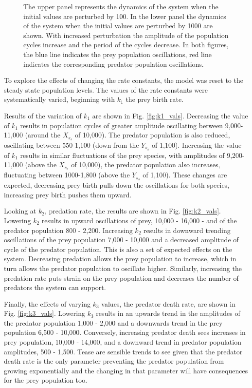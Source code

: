 \documentclass{article}
\begin{document}
\begin{figure}[H]
    \caption{The upper panel represents the dynamics of the system when the initial values are perturbed by 100. In the lower panel the dynamics of the system when the initial values are perturbed by 1000 are shown. With increased perturbation the amplitude of the population cycles increase and the period of the cycles decrease. In both figures, the blue line indicates the prey population oscillations, red line indicates the corresponding predator population oscillations.}
    \label{fig:testing_inital_vals}
\end{figure}

To explore the effects of changing the rate constants, the model was reset to the steady state population levels.  
The values of the rate constants were systematically varied, beginning with $k_1$ the prey birth rate. 

Results of the variation of $k_1$ are shown in Fig. \ref{fig:k1_vals}. Decreasing the value of $k_1$ results in population cycles of greater amplitude oscillating between 9,000-11,000 (around the $X_s_s$ of 10,000). The predator population is also reduced, oscillating between 550-1,100 (down from the $Y_s_s$ of 1,100). Increasing the value of $k_1$ results in similar fluctuations of the prey species, with amplitudes of 9,200-11,000 (above the $X_s_s$ of 10,000), the predator population also increases, fluctuating between 1000-1,800 (above the $Y_s_s$ of 1,100). These changes are expected, decreasing prey birth pulls down the oscillations for both species, increasing prey birth pushes them upward. 

Looking at $k_2$, predation rate, the results are shown in Fig. \ref{fig:k2_vals}. Lowering $k_2$ results in upward oscillations of prey, 10,000 - 16,000 - and of the predator population 800 - 2,200. Increasing $k_2$ results in downward trending oscillations of the prey population 7,000 - 10,000 and a decreased amplitude of cycle of the predator population. This is also a set of expected effects on the system. Decreasing predation allows the prey population to increase, which in turn allows the predator population to oscillate higher. Similarly, increasing the predation rate puts strain on the prey population and decreases the number of predators the system can support. 

Finally, the effects of varying $k_3$ values, the predator death rate, are shown in Fig. \ref{fig:k3_vals}. Lowering $k_3$ results in an upwards trend in the amplitudes of the predator population 1,000 - 2,000 and a downwards trend in the prey population 6,500 - 10,000. Conversely, increasing predator death sees increases in prey population, 10,000 - 14,000, and a downward trend in predator population amplitudes, 500 - 1,500. Tease are sensible trends to see given that the predator death rate is the only parameter preventing the predator population from growing exponentially and the changing in that parameter will have consequences for the prey population too.   
\end{document}

